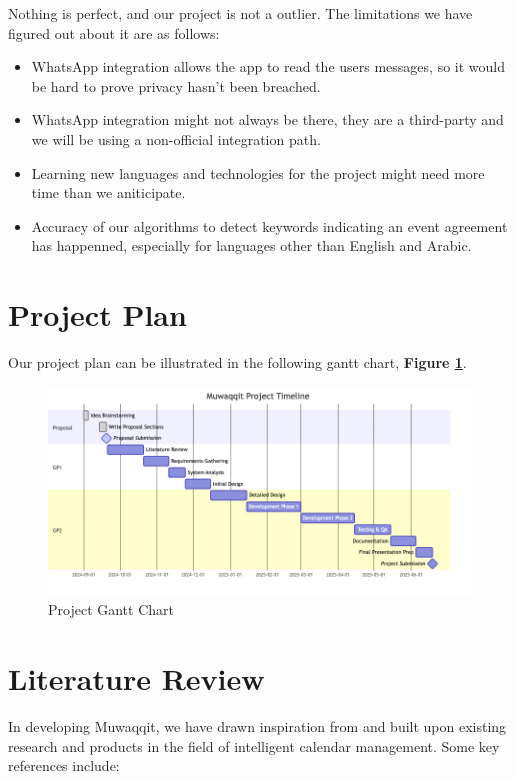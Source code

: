 \documentclass[12pt,a4paper]{article}
\begin{document}
Nothing is perfect, and our project is not a outlier. The limitations we have figured out about it are as follows:

\begin{itemize}
    \item WhatsApp integration allows the app to read the users messages, so it would be hard to prove privacy hasn't been breached.
    \item WhatsApp integration might not always be there, they are a third-party and we will be using a non-official integration path.
    \item Learning new languages and technologies for the project might need more time than we aniticipate.
    \item Accuracy of our algorithms to detect keywords indicating an event agreement has happenned, especially for languages other than English and Arabic.
\end{itemize}

\section{Project Plan}

Our project plan can be illustrated in the following gantt chart, \textbf{Figure \ref{fig:project-gantt-chart}}.

\begin{figure}[!h]
    \centering
    \includegraphics[width=\textwidth]{images/gantt.png}
    \caption{Project Gantt Chart}
    \label{fig:project-gantt-chart}
\end{figure}

\section{Literature Review}

In developing Muwaqqit, we have drawn inspiration from and built upon existing research and products in the field of intelligent calendar management. Some key references include:
\end{document}

